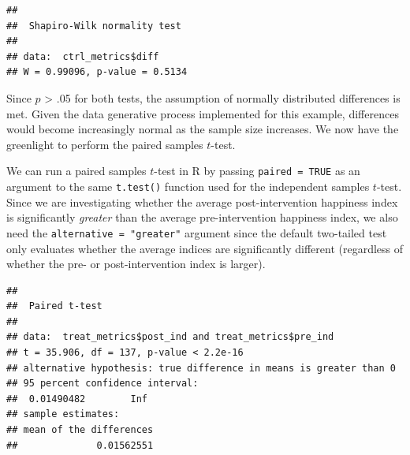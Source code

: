 \documentclass[
]{book}
\newenvironment{Shaded}{\begin{snugshade}}{\end{snugshade}}
\newcommand{\AttributeTok}[1]{\textcolor[rgb]{0.77,0.63,0.00}{#1}}
\newcommand{\CommentTok}[1]{\textcolor[rgb]{0.56,0.35,0.01}{\textit{#1}}}
\newcommand{\ConstantTok}[1]{\textcolor[rgb]{0.00,0.00,0.00}{#1}}
\newcommand{\FunctionTok}[1]{\textcolor[rgb]{0.00,0.00,0.00}{#1}}
\newcommand{\NormalTok}[1]{#1}
\newcommand{\SpecialCharTok}[1]{\textcolor[rgb]{0.00,0.00,0.00}{#1}}
\newcommand{\StringTok}[1]{\textcolor[rgb]{0.31,0.60,0.02}{#1}}
\begin{document}
\begin{Shaded}
\end{Shaded}

\begin{verbatim}
## 
##  Shapiro-Wilk normality test
## 
## data:  ctrl_metrics$diff
## W = 0.99096, p-value = 0.5134
\end{verbatim}

Since \(p\) \textgreater{} .05 for both tests, the assumption of normally distributed differences is met. Given the data generative process implemented for this example, differences would become increasingly normal as the sample size increases. We now have the greenlight to perform the paired samples \(t\)-test.

We can run a paired samples \(t\)-test in R by passing \texttt{paired\ =\ TRUE} as an argument to the same \texttt{t.test()} function used for the independent samples \(t\)-test. Since we are investigating whether the average post-intervention happiness index is significantly \emph{greater} than the average pre-intervention happiness index, we also need the \texttt{alternative\ =\ "greater"} argument since the default two-tailed test only evaluates whether the average indices are significantly different (regardless of whether the pre- or post-intervention index is larger).

\begin{Shaded}
\end{Shaded}

\begin{verbatim}
## 
##  Paired t-test
## 
## data:  treat_metrics$post_ind and treat_metrics$pre_ind
## t = 35.906, df = 137, p-value < 2.2e-16
## alternative hypothesis: true difference in means is greater than 0
## 95 percent confidence interval:
##  0.01490482        Inf
## sample estimates:
## mean of the differences 
##              0.01562551
\end{verbatim}
\end{document}
